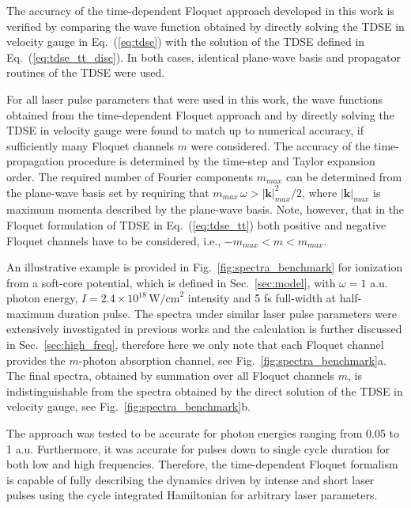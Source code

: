 \documentclass[
pra%
,preprint%
,amssymb, nobibnotes, aps, superscriptaddress, floatfix]{revtex4}
\newcommand{\kv}{\mathbf{k}}
\begin{document}
The accuracy of the time-dependent Floquet approach developed in this work is verified by comparing the wave function obtained by directly solving the TDSE in velocity gauge in Eq.~(\ref{eq:tdse}) with the solution of the TDSE defined in Eq.~(\ref{eq:tdse_tt_disc}). In both cases, identical plane-wave basis and propagator routines of the TDSE were used. 

For all laser pulse parameters that were used in this work, the wave functions obtained from the time-dependent Floquet approach and by directly solving the TDSE in velocity gauge were found to match up to numerical accuracy, if sufficiently many Floquet channels $m$ were considered.
The accuracy of the time-propagation procedure is determined by the time-step and Taylor expansion order. The required number of Fourier components $m_{max}$ can be determined from the plane-wave basis set by requiring that $m_{max} \, \omega > |\kv|^2_{max}/2$, where $|\kv|_{max}$ is maximum momenta described by the plane-wave basis. Note, however, that in the Floquet formulation of TDSE in Eq.~(\ref{eq:tdse_tt}) both positive and negative Floquet channels have to be considered, i.e., $-m_{max} < m < m_{max}$.

An illustrative example is provided in Fig.~\ref{fig:spectra_benchmark} for ionization from a soft-core potential, which is defined in Sec.~\ref{sec:model}, with $\omega=1$ a.u. photon energy, $I=2.4 \times 10^{18} \, \text{W/cm}^2$ intensity and 5 fs full-width at half-maximum duration pulse. The spectra under similar laser pulse parameters were extensively investigated in previous works \cite{Toyota2008,Toyota2007,Tolstikhin2008,Demekhin2012,Baghery2017} and the calculation is further discussed in Sec.~\ref{sec:high_freq}, therefore here we only note that each Floquet channel provides the $m$-photon absorption channel, see Fig.~\ref{fig:spectra_benchmark}a. The final spectra, obtained by summation over all Floquet channels $m$, is indistinguishable from the spectra obtained by the direct solution of the TDSE in velocity gauge, see  Fig.~\ref{fig:spectra_benchmark}b. 

The approach was tested to be accurate for photon energies ranging from 0.05 to 1 a.u. Furthermore, it was accurate for pulses down to single cycle duration for both low and high frequencies. 
Therefore, the time-dependent Floquet formalism is capable of fully describing the dynamics driven by intense and short laser pulses using the cycle integrated Hamiltonian for arbitrary laser parameters.
\end{document}
